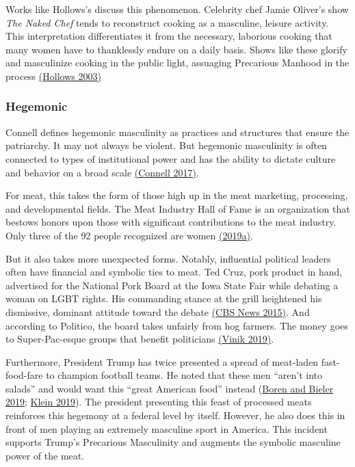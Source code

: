 \documentclass[twoside]{report}
\begin{document}
\begin{multicols*}{2}
Works like Hollows's discuss this phenomenon. Celebrity chef Jamie Oliver's show \emph{The Naked Chef} tends to reconstruct cooking as a masculine, leisure activity. This interpretation differentiates it from the necessary, laborious cooking that many women have to thanklessly endure on a daily basis. Shows like these glorify and masculinize cooking in the public light, assuaging Precarious Manhood in the process \hyperlink{hollows}{(Hollows 2003)}

\subsubsection{Hegemonic}

Connell defines hegemonic masculinity as practices and structures that
ensure the patriarchy. It may not always be violent. But hegemonic
masculinity is often connected to types of institutional power and has
the ability to dictate culture and behavior on a broad scale \hyperlink{connell}{(Connell 2017)}.

For meat, this takes the form of those high up in the meat marketing,
processing, and developmental fields. The Meat Industry Hall of Fame is an
organization that bestows honors upon those with significant
contributions to the meat industry. Only three of the 92 people
recognized are women \hyperlink{2019a}{(2019a)}.

But it also takes more unexpected forms. Notably, influential political
leaders often have financial and symbolic ties to meat. Ted Cruz, pork
product in hand, advertised for the National Pork Board at the Iowa
State Fair while debating a woman on LGBT rights. His commanding stance
at the grill heightened his dismissive, dominant attitude toward the
debate \hyperlink{cbs}{(CBS News 2015)}. And according to Politico, the board takes unfairly from hog farmers. The money goes to Super-Pac-esque groups that
benefit politicians \hyperlink{vinik}{(Vinik 2019)}.

Furthermore, President Trump has twice presented a spread of meat-laden
fast-food-fare to champion football teams. He noted that these men
``aren't into salads'' and would want this ``great American food''
instead (\hyperlink{boren}{Boren and Bieler 2019}; \hyperlink{klein}{Klein 2019}). The president presenting this feast of processed meats reinforces this hegemony at a federal level by itself. However, he also does this in front of men playing an extremely masculine sport in America. This incident supports Trump's Precarious Masculinity and augments the symbolic masculine power of the meat.


\end{multicols*}
\end{document}
